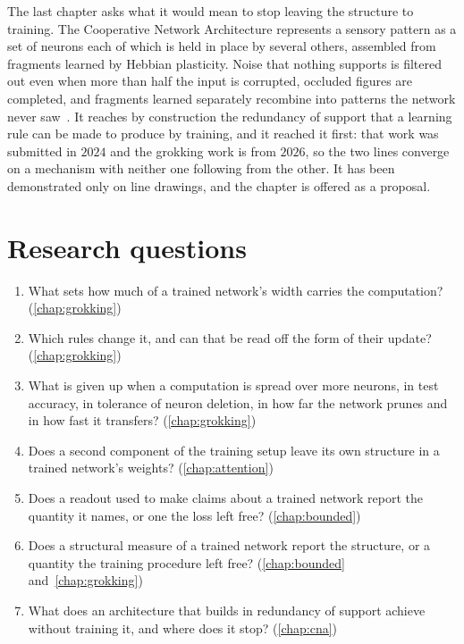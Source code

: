 The last chapter asks what it would mean to stop leaving the structure to
training. The Cooperative Network Architecture represents a sensory pattern as
a set of neurons each of which is held in place by several others, assembled
from fragments learned by Hebbian plasticity. Noise that nothing supports is
filtered out even when more than half the input is corrupted, occluded figures
are completed, and fragments learned separately recombine into patterns the
network never saw~\cite{sager_cooperative_2026}. It reaches by construction
the redundancy of support that a learning rule can be made to produce by
training, and it reached it first: that work was submitted in $2024$ and the
grokking work is from $2026$, so the two lines converge on a mechanism with
neither one following from the other. It has been demonstrated only on line
drawings, and the chapter is offered as a proposal.


\section{Research questions}
\label{sec:intro_questions}

\begin{enumerate}
    \item What sets how much of a trained network's width carries the
    computation? (\cref{chap:grokking})

    \item Which rules change it, and can that be read off the form of their
    update? (\cref{chap:grokking})

    \item What is given up when a computation is spread over more neurons, in
    test accuracy, in tolerance of neuron deletion, in how far the network
    prunes and in how fast it transfers? (\cref{chap:grokking})

    \item Does a second component of the training setup leave its own
    structure in a trained network's weights? (\cref{chap:attention})

    \item Does a readout used to make claims about a trained network report
    the quantity it names, or one the loss left free? (\cref{chap:bounded})

    \item Does a structural measure of a trained network report the structure,
    or a quantity the training procedure left free? (\cref{chap:bounded}
    and~\cref{chap:grokking})

    \item What does an architecture that builds in redundancy of support
    achieve without training it, and where does it stop? (\cref{chap:cna})
\end{enumerate}

